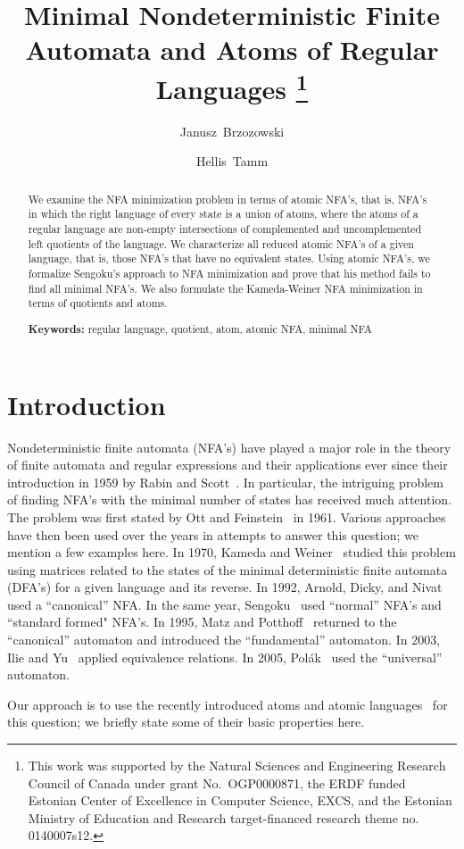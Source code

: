 \documentclass{llncs}
\title{Minimal Nondeterministic Finite Automata and Atoms of Regular Languages
\thanks{This work was supported 
by the Natural Sciences and Engineering Research Council of Canada under grant No.~OGP0000871, 
the ERDF funded Estonian Center of Excellence in Computer Science, EXCS, 
and the Estonian Ministry of Education and Research target-financed 
research theme no. 0140007s12.}}
\author{Janusz~Brzozowski\inst{1} \and Hellis~Tamm\inst{2}}
\institute{David R. Cheriton School of Computer Science, University of Waterloo, \\
Waterloo, ON, Canada N2L 3G1\\
\{{\tt brzozo@uwaterloo.ca}\}
\and
Institute of Cybernetics, Tallinn University of Technology,\\
Akadeemia tee 21, 12618 Tallinn, Estonia\\
\{{\tt hellis@cs.ioc.ee}\} 
}
\newcommand{\noin}{\noindent}
\begin{document}
\maketitle

\begin{abstract}
We examine the NFA minimization problem in terms of atomic NFA's, that is, NFA's in which the right language  of every state is a union of atoms, where the atoms of a regular language  are non-empty intersections of complemented and uncomplemented left quotients of the language. We characterize all reduced atomic NFA's of a given language,  that is, those NFA's that have no equivalent states. Using atomic NFA's, we formalize Sengoku's approach to NFA minimization  and prove that his method fails to find all minimal NFA's. We also formulate the Kameda-Weiner NFA minimization in terms of quotients and atoms. 
\medskip

\noin
{\bf Keywords:}
regular language,
quotient,
atom,
atomic NFA,
minimal NFA
\end{abstract}

\section{Introduction}

Nondeterministic finite automata (NFA's) have played a major role in the theory of finite automata and regular expressions  and their applications ever since their introduction in 1959 by Rabin and Scott~\cite{RaSc59}.
In particular, the intriguing problem of finding NFA's with the minimal number of states has received much attention.
The problem was first stated by Ott and Feinstein~\cite{OtFe61} in 1961.
Various approaches have then been used over the years in attempts to answer this question; we mention a few examples here.
In 1970, Kameda and Weiner~\cite{KaWe70} studied this problem using matrices related to the states of the minimal deterministic finite automata (DFA's) for a given language and its reverse. 
In 1992, Arnold, Dicky, and Nivat~\cite{ADN92} used a ``canonical'' NFA. 
In the same year, Sengoku~\cite{Sen92} used ``normal'' NFA's and ``standard formed" NFA's.
In 1995, Matz and Potthoff~\cite{MaPo95} returned to the ``canonical'' automaton and introduced the ``fundamental'' automaton.
In 2003, Ilie and Yu~\cite{IlYu03} applied equivalence relations.
In 2005, Pol\'ak~\cite{Pol05} used the ``universal'' automaton.

Our approach is to use the recently introduced atoms and atomic 
languages~\cite{BrTa11} for this question;  
we briefly state some of their basic properties here.
\end{document}
